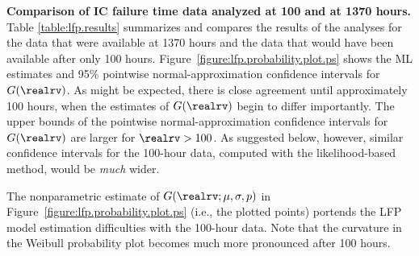 \begin{example}
{\bf Comparison of IC failure time data analyzed at 100 and at 1370 hours.}
Table \ref{table:lfp.results} summarizes and compares
the results of the analyses for the data that were available at 1370
hours and the data that would have been available after only 100
hours.  Figure~\ref{figure:lfp.probability.plot.ps} shows the ML
estimates and 95\% pointwise normal-approximation confidence intervals
for $G(\realrv)$.  As might be expected, there is close agreement
until approximately 100 hours, when the estimates of $G(\realrv)$
begin to differ importantly. The upper bounds of the pointwise
normal-approximation confidence intervals for $G(\realrv)$ are larger
for $\realrv > 100$.  As suggested below, however, similar confidence
intervals for the 100-hour data, computed with the likelihood-based
method, would be {\em much} wider.

The nonparametric estimate of $G(\realrv;\mu,\sigma,p)$ in
Figure~\ref{figure:lfp.probability.plot.ps} (i.e., the plotted
points) portends the LFP model estimation difficulties with the
100-hour data. Note that the curvature in the Weibull probability
plot becomes much more pronounced after 100 hours.
\end{example}
